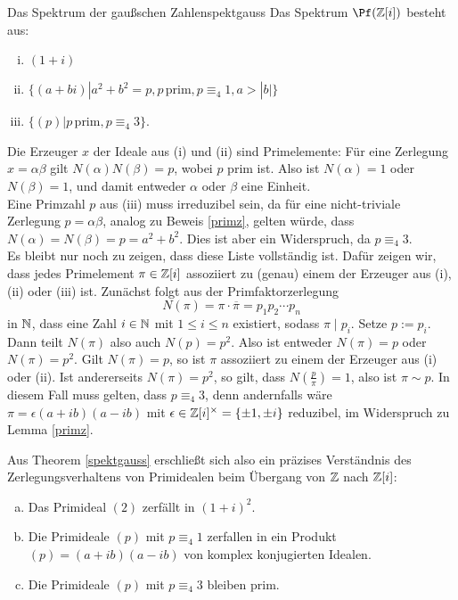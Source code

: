 \begin{theorem}{Das Spektrum der gaußschen Zahlen}{spektgauss}
Das Spektrum $\Pf(\Z[i])$ besteht aus:
\begin{enumerate}[(i)]
\item $(1+i)$
\item $\{(a+bi) | a^2+b^2=p, p \, \text{prim}, p \equiv_4 1, a>|b| \}$
\item $\{(p)| p \, \text{prim}, p \equiv_4 3 \}$.
\end{enumerate} 
\end{theorem}
\begin{beweis}
Die Erzeuger $x$ der Ideale aus (i) und (ii) sind Primelemente: Für eine Zerlegung $x=\alpha \beta$ gilt $N(\alpha)N(\beta) = p$, wobei $p$ prim ist. Also ist $N(\alpha)=1$ oder $N(\beta)=1$, und damit entweder $\alpha$ oder $\beta$ eine Einheit.\\
Eine Primzahl $p$ aus (iii) muss irreduzibel sein, da für eine nicht-triviale Zerlegung $p=\alpha \beta$, analog zu Beweis \ref{primz}, gelten würde, dass $N(\alpha) = N(\beta) = p = a^2+b^2$. Dies ist aber ein Widerspruch, da $p \equiv_4 3$.\\
Es bleibt nur noch zu zeigen, dass diese Liste vollständig ist. Dafür zeigen wir, dass jedes Primelement $\pi \in \mathbb{Z}[i]$ assoziiert zu (genau) einem der Erzeuger aus (i), (ii) oder (iii) ist. Zunächst folgt aus der Primfaktorzerlegung 
\begin{equation}
N(\pi) = \pi \cdot \overline{\pi} = p_1p_2 \cdots p_n
\end{equation}
in $\mathbb{N}$, dass eine Zahl $i \in \mathbb{N}$ mit $1 \leq i \leq n$ existiert, sodass $\pi \mid p_i$. Setze $p:=p_i$. Dann teilt $N(\pi)$ also auch $N(p)=p^2$. Also ist entweder $N(\pi)=p$ oder $N(\pi)=p^2$. Gilt $N(\pi)=p$, so ist $\pi$ assoziiert zu einem der Erzeuger aus (i) oder (ii). Ist andererseits $N(\pi)=p^2$, so gilt, dass $N\left(\frac{p}{\pi}\right) = 1$, also ist $\pi \sim p$. In diesem Fall muss gelten, dass $p \equiv_4 3$, denn andernfalls wäre $\pi = \epsilon (a+ib)(a-ib)$ mit $\epsilon \in \mathbb{Z}[i]^\times = \{\pm 1, \pm i\}$ reduzibel, im Widerspruch zu Lemma \ref{primz}.
\end{beweis}
\begin{beispiel}
Aus Theorem \ref{spektgauss} erschließt sich also ein präzises Verständnis des Zerlegungsverhaltens von Primidealen beim Übergang von $\mathbb{Z}$ nach $\mathbb{Z}[i]$:
\begin{enumerate}[(a)]
\item Das Primideal $(2)$ zerfällt in $(1+i)^2$.
\item Die Primideale $(p)$ mit $p \equiv_4 1$ zerfallen in ein Produkt $(p)=(a+ib)(a-ib)$ von komplex konjugierten Idealen.
\item Die Primideale $(p)$ mit $p \equiv_4 3$ bleiben prim.
\end{enumerate}
\end{beispiel}
